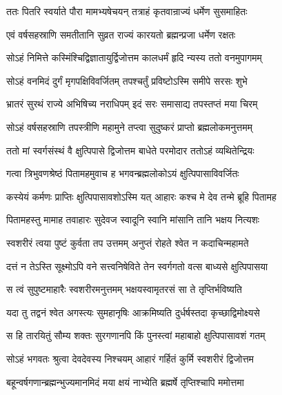 \twolineshloka
{ततः पितरि स्वर्याते पौरा मामभ्यषेचयन्}
{तत्राहं कृतवान्राज्यं धर्मेण सुसमाहितः} %

\twolineshloka
{एवं वर्षसहस्राणि समतीतानि सुव्रत}
{राज्यं कारयतो ब्रह्मन्प्रजा धर्मेण रक्षतः} %

\twolineshloka
{सोऽहं निमित्ते कस्मिंश्चिद्विज्ञातायुर्द्विजोत्तम}
{कालधर्मं हृदि न्यस्य ततो वनमुपागमम्} %

\twolineshloka
{सोऽहं वनमिदं दुर्गं मृगपक्षिविवर्जितम्}
{तपश्चर्तुं प्रविष्टोऽस्मि समीपे सरसः शुभे} %

\twolineshloka
{भ्रातरं सुरथं राज्ये अभिषिच्य नराधिपम्}
{इदं सरः समासाद्य तपस्तप्तं मया चिरम्} %

\twolineshloka
{सोऽहं वर्षसहस्राणि तपस्त्रीणि महामुने}
{तप्त्वा सुदुष्करं प्राप्तो ब्रह्मलोकमनुत्तमम्} %

\twolineshloka
{ततो मां स्वर्गसंस्थं वै क्षुत्पिपासे द्विजोत्तम}
{बाधेते परमोदार ततोऽहं व्यथितेन्द्रियः} %

\twolineshloka
{गत्वा त्रिभुवणश्रेष्ठं पितामहमुवाच ह}
{भगवन्ब्रह्मलोकोऽयं क्षुत्पिपासाविवर्जितः} %

\twolineshloka
{कस्येयं कर्मणः प्राप्तिः क्षुत्पिपासावशोऽस्मि यत्}
{आहारः कश्च मे देव तन्मे ब्रूहि पितामह} %

\twolineshloka
{पितामहस्तु मामाह तवाहारः सुदेवज}
{स्वादूनि स्वानि मांसानि तानि भक्षय नित्यशः} %

\twolineshloka
{स्वशरीरं त्वया पुष्टं कुर्वता तप उत्तमम्}
{अनुप्तं रोहते श्वेत न कदाचिन्महामते} %

\twolineshloka
{दत्तं न तेऽस्ति सूक्ष्मोऽपि वने सत्त्वनिषेविते}
{तेन स्वर्गगतो वत्स बाध्यसे क्षुत्पिपासया} %

\twolineshloka
{स त्वं सुपुष्टमाहारैः स्वशरीरमनुत्तमम्}
{भक्षयस्वामृतरसं सा ते तृप्तिर्भविष्यति} %

\twolineshloka
{यदा तु तद्वनं श्वेत अगस्त्यः सुमहानृषिः}
{आक्रमिष्यति दुर्धर्षस्तदा कृच्छाद्विमोक्ष्यसे} %

\twolineshloka
{स हि तारयितुं सौम्य शक्तः सुरगणानपि}
{किं पुनस्त्वां महाबाहो क्षुत्पिपासावशं गतम्} %

\twolineshloka
{सोऽहं भगवतः श्रुत्वा देवदेवस्य निश्चयम्}
{आहारं गर्हितं कुर्मि स्वशरीरं द्विजोत्तम} %

\twolineshloka
{बहून्वर्षगणान्ब्रह्मन्भुज्यमानमिदं मया}
{क्षयं नाभ्येति ब्रह्मर्षे तृप्तिश्चापि ममोत्तमा} %

